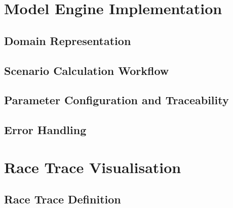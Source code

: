 \section{Model Engine Implementation}
\label{sec:model-engine-implementation}

\subsection{Domain Representation}

\subsection{Scenario Calculation Workflow}

\subsection{Parameter Configuration and Traceability}

\subsection{Error Handling}

\section{Race Trace Visualisation}
\label{sec:race-trace}

\subsection{Race Trace Definition}

